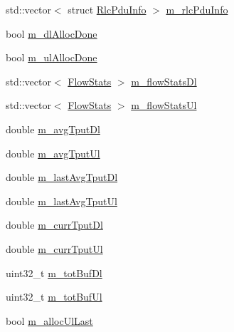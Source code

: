 \begin{DoxyCompactItemize}
\item 
std\+::vector$<$ struct \hyperlink{structns3_1_1RlcPduInfo}{Rlc\+Pdu\+Info} $>$ \hyperlink{structns3_1_1MmWaveFlexTtiMaxRateMacScheduler_1_1UeSchedInfo_aea70d55e0107b02de328e10ff6ea6d95}{m\+\_\+rlc\+Pdu\+Info}
\item 
bool \hyperlink{structns3_1_1MmWaveFlexTtiMaxRateMacScheduler_1_1UeSchedInfo_a32c99b41630c802481efa41a3b1695f0}{m\+\_\+dl\+Alloc\+Done}
\item 
bool \hyperlink{structns3_1_1MmWaveFlexTtiMaxRateMacScheduler_1_1UeSchedInfo_a693db64f17bce7b9ea7edce898b51f8e}{m\+\_\+ul\+Alloc\+Done}
\item 
std\+::vector$<$ \hyperlink{structns3_1_1MmWaveFlexTtiMaxRateMacScheduler_1_1FlowStats}{Flow\+Stats} $>$ \hyperlink{structns3_1_1MmWaveFlexTtiMaxRateMacScheduler_1_1UeSchedInfo_a680ea50d5c9d75cb0b368b716ed49193}{m\+\_\+flow\+Stats\+Dl}
\item 
std\+::vector$<$ \hyperlink{structns3_1_1MmWaveFlexTtiMaxRateMacScheduler_1_1FlowStats}{Flow\+Stats} $>$ \hyperlink{structns3_1_1MmWaveFlexTtiMaxRateMacScheduler_1_1UeSchedInfo_a8fdf89e0f98a4bed8c65c1fdb7911bcd}{m\+\_\+flow\+Stats\+Ul}
\item 
double \hyperlink{structns3_1_1MmWaveFlexTtiMaxRateMacScheduler_1_1UeSchedInfo_a6d9c624f6cc37156e3809dd66649bab2}{m\+\_\+avg\+Tput\+Dl}
\item 
double \hyperlink{structns3_1_1MmWaveFlexTtiMaxRateMacScheduler_1_1UeSchedInfo_ac12a555eeacdb87d95dc0f0db5a775a2}{m\+\_\+avg\+Tput\+Ul}
\item 
double \hyperlink{structns3_1_1MmWaveFlexTtiMaxRateMacScheduler_1_1UeSchedInfo_aac0d7512fc84969a757e0c482a42818f}{m\+\_\+last\+Avg\+Tput\+Dl}
\item 
double \hyperlink{structns3_1_1MmWaveFlexTtiMaxRateMacScheduler_1_1UeSchedInfo_a7caae9b33357eeacb8f061716828d08e}{m\+\_\+last\+Avg\+Tput\+Ul}
\item 
double \hyperlink{structns3_1_1MmWaveFlexTtiMaxRateMacScheduler_1_1UeSchedInfo_ad51f0b3023b7ee12099d93490528a473}{m\+\_\+curr\+Tput\+Dl}
\item 
double \hyperlink{structns3_1_1MmWaveFlexTtiMaxRateMacScheduler_1_1UeSchedInfo_a2ceaf03bcb6aef2aa18f5cbeb9e185ed}{m\+\_\+curr\+Tput\+Ul}
\item 
uint32\+\_\+t \hyperlink{structns3_1_1MmWaveFlexTtiMaxRateMacScheduler_1_1UeSchedInfo_aa35fc3788dea3bcfa457d722f8065034}{m\+\_\+tot\+Buf\+Dl}
\item 
uint32\+\_\+t \hyperlink{structns3_1_1MmWaveFlexTtiMaxRateMacScheduler_1_1UeSchedInfo_af22690ff166d913996aa94aa22839abf}{m\+\_\+tot\+Buf\+Ul}
\item 
bool \hyperlink{structns3_1_1MmWaveFlexTtiMaxRateMacScheduler_1_1UeSchedInfo_a50a4dff3a6d9f55efbd5f7f9bd08c126}{m\+\_\+alloc\+Ul\+Last}
\end{DoxyCompactItemize}


